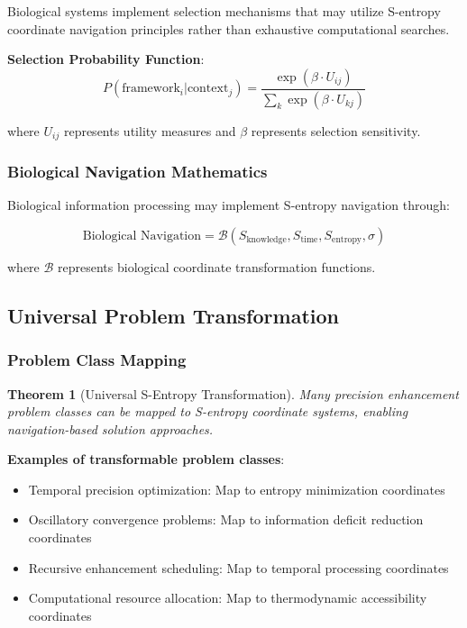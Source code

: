 \documentclass[12pt,a4paper]{article}
\newtheorem{theorem}{Theorem}[section]
\begin{document}
{Biological systems implement selection mechanisms that may utilize S-entropy coordinate navigation principles rather than exhaustive computational searches.

\textbf{Selection Probability Function}:
\begin{equation}
P(\text{framework}_i | \text{context}_j) = \frac{\exp(\beta \cdot U_{ij})}{\sum_k \exp(\beta \cdot U_{kj})}
\label{eq:framework_selection}
\end{equation}

where $U_{ij}$ represents utility measures and $\beta$ represents selection sensitivity.

\subsubsection{Biological Navigation Mathematics}

Biological information processing may implement S-entropy navigation through:

\begin{equation}
\text{Biological Navigation} = \mathcal{B}(S_{\text{knowledge}}, S_{\text{time}}, S_{\text{entropy}}, \sigma)
\label{eq:biological_navigation}
\end{equation}

where $\mathcal{B}$ represents biological coordinate transformation functions.

\subsection{Universal Problem Transformation}

\subsubsection{Problem Class Mapping}

\begin{theorem}[Universal S-Entropy Transformation]
Many precision enhancement problem classes can be mapped to S-entropy coordinate systems, enabling navigation-based solution approaches.
\end{theorem}

\textbf{Examples of transformable problem classes}:
\begin{itemize}
\item Temporal precision optimization: Map to entropy minimization coordinates
\item Oscillatory convergence problems: Map to information deficit reduction coordinates
\item Recursive enhancement scheduling: Map to temporal processing coordinates
\item Computational resource allocation: Map to thermodynamic accessibility coordinates
\end{itemize}

}
\end{document}
